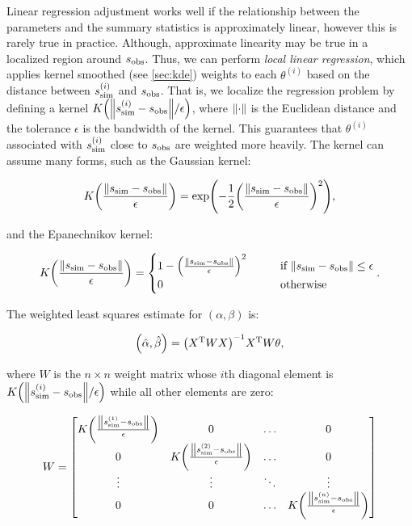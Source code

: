 Linear regression adjustment works well if the relationship between the parameters and the summary statistics is approximately linear, however this is rarely true in practice. Although, approximate linearity may be true in a localized region around $s_\mathrm{obs}$. Thus, we can perform \textit{local linear regression}, which applies kernel smoothed (see \cref{sec:kde}) weights to each $\theta^{(i)}$ based on the distance between $s_\mathrm{sim}^{(i)}$ and $s_\mathrm{obs}$. That is, we localize the regression problem by defining a kernel $K\qty(\norm{s_\mathrm{sim}^{(i)} - s_\mathrm{obs}}/ \epsilon)$, where $\norm{\cdot}$ is the Euclidean distance and the tolerance $\epsilon$ is the bandwidth of the kernel. This guarantees that $\theta^{(i)}$ associated with $s_\mathrm{sim}^{(i)}$ close to $s_\mathrm{obs}$ are weighted more heavily. The kernel can assume many forms, such as the Gaussian kernel:

\begin{equation}\label{eq:gaussian_kernel_lra}
    K \qty( \frac{\norm{s_\mathrm{sim} - s_\mathrm{obs}}}{\epsilon} ) = \exp(-\frac{1}{2} \qty(\frac{\norm{s_\mathrm{sim} - s_\mathrm{obs}}}{\epsilon})^2 ),
\end{equation}

and the Epanechnikov kernel:

\begin{equation}\label{eq:epkov_kernel_lra}
    K \qty( \frac{\norm{s_\mathrm{sim} - s_\mathrm{obs}}}{\epsilon} )  = \begin{cases} 
    1 - \qty(\frac{\norm{s_\mathrm{sim} - s_\mathrm{obs}}}{\epsilon})^2 \qquad &\text{if } \norm{s_\mathrm{sim} - s_\mathrm{obs}} \leq \epsilon
    \\
    0 \qquad &\text{otherwise}
    \end{cases}.
\end{equation}

The weighted least squares estimate for $(\alpha, \beta)$ is: 

\begin{equation}\label{eq:locreg_sol}
    \qty(\hat{\alpha}, \hat{\beta}) = \qty(X^{\mathrm{T}} W X)^{-1} X^{\mathrm{T}} W \theta,
\end{equation}

where $W$ is the $n\times n$ weight matrix whose $i$th diagonal element is $K\qty(\norm{s_\mathrm{sim}^{(i)} - s_\mathrm{obs}}/ \epsilon)$ while all other elements are zero: 

\begin{equation*}
    W = \begin{bmatrix}
    K\qty(\frac{\norm{s_\mathrm{sim}^{(1)} - s_\mathrm{obs}}}{\epsilon}) & 0 & \dots & 0 
    \\
    0 & K\qty(\frac{\norm{s_\mathrm{sim}^{(2)} - s_\mathrm{obs}}}{\epsilon}) & \dots & 0 
    \\
    \vdots & \vdots & \ddots & \vdots 
    \\
    0 & 0 & \dots & K\qty(\frac{\norm{s_\mathrm{sim}^{(n)} - s_\mathrm{obs}}}{\epsilon})
    \end{bmatrix}
\end{equation*}

